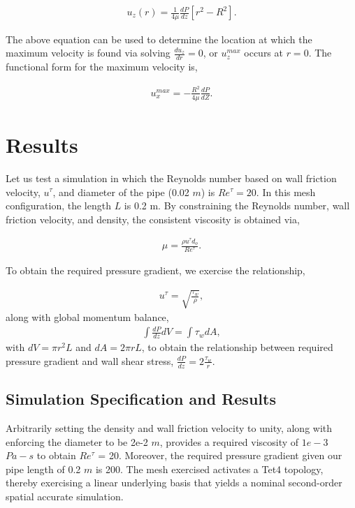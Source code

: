 \documentclass{article}
\begin{document}
\begin{align}
  u_z(r) = \frac{1}{4 \mu}\frac{d P}{dz}\left[ r^2 - R^2 \right].
\label{eq:simpleEqWithoutK}
\end{align}

The above equation can be used to determine the location at which 
the maximum velocity is found via solving $\frac{du_z}{dr} = 0$, or $u^{max}_z$ 
occurs at $r=0$. The functional form for the maximum velocity is,

\begin{align}
  u^{max}_x = -\frac{R^2}{4 \mu}\frac{d P}{d Z}.
\label{eq:uMax}
\end{align}

\section{Results}
Let us test a simulation in which the Reynolds number based on wall friction
velocity, $u^\tau$, and diameter of the pipe (0.02 $m$) is $Re^\tau = 20$. 
In this mesh configuration, the length $L$ is 0.2 m.
By constraining the Reynolds number, wall friction velocity, and density, 
the consistent viscosity is obtained via,

\begin{align}
  \mu = \frac{\rho u^\tau d_o}{Re^\tau}.
\label{eq:muForm}
\end{align}

To obtain the required pressure gradient, we exercise the relationship,

\begin{align}
  u^\tau = \sqrt{\frac{\tau_w}{\rho}},
\label{eq:tauWall}
\end{align}
along with global momentum balance,
%
\begin{align}
\int \frac{dP}{dz} dV = \int \tau_w dA,
\label{eq:balance}
\end{align}
with $dV = \pi r^2 L$ and $dA = 2\pi r L$, to obtain the relationship between
required pressure gradient and wall shear stress, $\frac{dP}{dz} = 2\frac{\tau_w}{r}$.

\subsection{Simulation Specification and Results}

Arbitrarily setting the density and wall friction velocity to unity, 
along with enforcing the diameter to be 2e-2 $m$, provides a required 
viscosity of $1e-3$ $Pa-s$ to obtain $Re^\tau$ = 20. Moreover, the required 
pressure gradient given our pipe length of 0.2 $m$ is 200. The mesh exercised 
activates a Tet4 topology, thereby exercising a linear underlying basis 
that yields a nominal second-order spatial accurate simulation.
\end{document}
